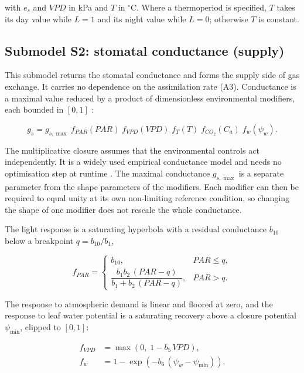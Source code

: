 with $e_s$ and $\mathit{VPD}$ in kPa and $T$ in $^\circ$C. Where a
thermoperiod is specified, $T$ takes its day value while $L=1$ and its night
value while $L=0$; otherwise $T$ is constant.

\subsection{Submodel S2: stomatal conductance (supply)}
\label{sec:jarvis}

This submodel returns the stomatal conductance and forms the supply side of gas
exchange. It carries no dependence on the assimilation rate (A3). Conductance
is a maximal value reduced by a product of dimensionless environmental
modifiers, each bounded in $[0,1]$ \citep{Jarvis1976,Damour2010}:

\begin{equation}
g_s = g_{s,\max}\;
f_{\mathit{PAR}}(\mathit{PAR})\;
f_{\mathit{VPD}}(\mathit{VPD})\;
f_T(T)\;
f_{\mathit{CO_2}}(C_a)\;
f_w(\psi_w).
\label{eq:jarvis}
\end{equation}

The multiplicative closure assumes that the environmental controls act
independently. It is a widely used empirical conductance model and needs no
optimisation step at runtime \citep{Damour2010,Buckley2017}. The maximal
conductance $g_{s,\max}$ is a separate parameter from the shape parameters of the
modifiers. Each modifier can then be required to equal unity at its own
non-limiting reference condition, so changing the shape of one modifier does not
rescale the whole conductance.

The light response is a saturating hyperbola with a residual conductance
$b_{10}$ below a breakpoint $q = b_{10}/b_1$,

\begin{equation}
f_{\mathit{PAR}} =
\begin{cases}
b_{10}, & \mathit{PAR} \leq q, \\[6pt]
\dfrac{b_1 b_2\,(\mathit{PAR}-q)}{b_1 + b_2\,(\mathit{PAR}-q)}, & \mathit{PAR} > q .
\end{cases}
\label{eq:jarvis_par}
\end{equation}

The response to atmospheric demand is linear and floored at zero, and the
response to leaf water potential is a saturating recovery above a closure
potential $\psi_{\min}$, clipped to $[0,1]$:

\begin{align}
f_{\mathit{VPD}} &= \max\!\left(0,\; 1 - b_5\,\mathit{VPD}\right),
\label{eq:jarvis_vpd}\\[4pt]
f_w &= 1 - \exp\!\left(-b_6\,(\psi_w - \psi_{\min})\right).
\label{eq:jarvis_water}
\end{align}

